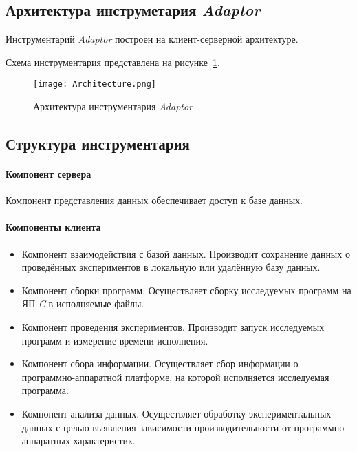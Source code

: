 \subsection{Архитектура инструметария \textit{Adaptor}}
Инструментарий \textit{Adaptor} построен на клиент-серверной архитектуре.

Схема инструментария представлена на рисунке~\ref{img:architecture}.

\begin{figure}
	\begin{center}
		\texttt{[image: Architecture.png]}
	\end{center}
	\label{img:architecture}
	\caption{Архитектура инструментария \textit{Adaptor}}
\end{figure}

\subsection{Структура инструментария}

\paragraph{Компонент сервера}
Компонент представления данных обеспечивает доступ к базе данных.

\paragraph{Компоненты клиента}

\begin{itemize}
	\item Компонент взаимодействия с базой данных. Производит сохранение данных о проведённых экспериментов в локальную или удалённую базу данных.
	\item Компонент сборки программ. Осуществляет сборку исследуемых программ на ЯП \textit{C} в исполняемые файлы.
	\item Компонент проведения экспериментов. Производит запуск исследуемых программ и измерение времени исполнения.
	\item Компонент сбора информации. Осуществляет сбор информации о программно-аппаратной платформе, на которой исполняется исследуемая программа.
	\item Компонент анализа данных. Осуществляет обработку экспериментальных данных с целью выявления зависимости производительности от программно-аппаратных характеристик.
\end{itemize}


